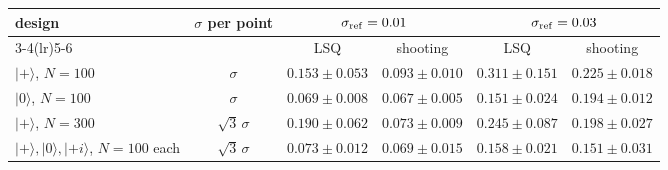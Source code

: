 \begin{tabular}{lccccc}
\toprule
design & $\sigma$ per point & \multicolumn{2}{c}{$\sigma_{\rm ref}=0.01$} & \multicolumn{2}{c}{$\sigma_{\rm ref}=0.03$} \\
\cmidrule(lr){3-4}\cmidrule(lr){5-6}
 & & LSQ & shooting & LSQ & shooting \\
\midrule
$|+\rangle$, $N=100$ & $\sigma$ & $0.153\pm0.053$ & $0.093\pm0.010$ & $0.311\pm0.151$ & $0.225\pm0.018$ \\
$|0\rangle$, $N=100$ & $\sigma$ & $0.069\pm0.008$ & $0.067\pm0.005$ & $0.151\pm0.024$ & $0.194\pm0.012$ \\
$|+\rangle$, $N=300$ & $\sqrt{3}\,\sigma$ & $0.190\pm0.062$ & $0.073\pm0.009$ & $0.245\pm0.087$ & $0.198\pm0.027$ \\
$|+\rangle,|0\rangle,|{+i}\rangle$, $N=100$ each & $\sqrt{3}\,\sigma$ & $0.073\pm0.012$ & $0.069\pm0.015$ & $0.158\pm0.021$ & $0.151\pm0.031$ \\
\bottomrule
\end{tabular}
